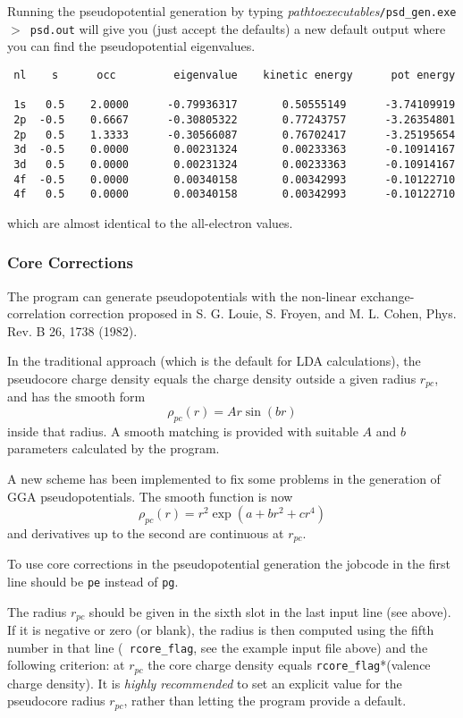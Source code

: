 \documentclass[11pt]{article}
\begin{document}
Running the pseudopotential generation by typing
\textit{pathtoexecutables}\texttt{/psd{\_}gen.exe $>$ psd.out}
will give you (just accept the defaults) a new default output
where you can find the pseudopotential eigenvalues.

\begin{verbatim}
 nl    s      occ         eigenvalue    kinetic energy      pot energy

 1s   0.5    2.0000      -0.79936317       0.50555149      -3.74109919
 2p  -0.5    0.6667      -0.30805322       0.77243757      -3.26354801
 2p   0.5    1.3333      -0.30566087       0.76702417      -3.25195654
 3d  -0.5    0.0000       0.00231324       0.00233363      -0.10914167
 3d   0.5    0.0000       0.00231324       0.00233363      -0.10914167
 4f  -0.5    0.0000       0.00340158       0.00342993      -0.10122710
 4f   0.5    0.0000       0.00340158       0.00342993      -0.10122710
\end{verbatim}
which are almost identical to the all-electron values.


\subsubsection{Core Corrections}
\label{sec:cc}
The program can generate pseudopotentials with the non-linear
exchange-correlation correction proposed in S. G. Louie, S. Froyen,
and M. L. Cohen, Phys. Rev. B 26, 1738 (1982).

In the traditional approach (which is the default for LDA
calculations), the pseudocore charge density equals the charge density
outside a given radius $r_{pc}$, and has the smooth form
$$
\rho_{pc}(r) = A r   \sin(b r)
$$
inside that radius. A smooth matching is provided with suitable $A$
and $b$ parameters calculated by the program.

A new scheme has been implemented to fix some problems in the generation
of GGA pseudopotentials. The smooth function is now
$$
\rho_{pc}(r) =  r^2  \exp{(a + b r^2 +c r^4)}
$$
and derivatives up to the second are continuous  at $r_{pc}$.

To use core corrections in the pseudopotential generation
the jobcode in the first line should be {\tt pe} instead of {\tt pg}.

The radius $r_{pc}$ should be  given in the sixth slot in the last
input line (see above). If it is negative or zero (or blank), the
radius is then computed using the fifth number in that line ({\tt
rcore\_flag}, see the example input file above)
and the following criterion: at $r_{pc}$ the core charge density
equals {\tt rcore\_flag}*(valence charge density).
It is {\it highly recommended} to set an explicit value for the pseudocore
radius $r_{pc}$, rather than letting the program provide a default.
\end{document}
